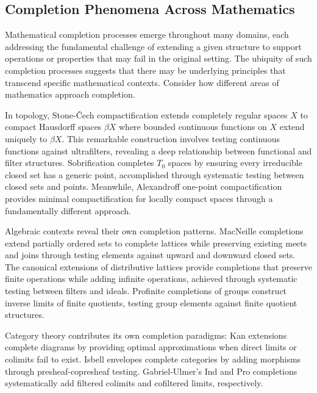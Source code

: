 \documentclass[11pt]{article}
\theoremstyle{plain}
\theoremstyle{definition}
\theoremstyle{remark}
\begin{document}
\subsection{Completion Phenomena Across Mathematics}
Mathematical completion processes emerge throughout many domains, each addressing the fundamental challenge of extending a given structure to support operations or properties that may fail in the original setting. The ubiquity of such completion processes suggests that there may be underlying principles that transcend specific mathematical contexts. Consider how different areas of mathematics approach completion.

In topology, Stone-\v{C}ech compactification \cite{stone1936theory} extends completely regular spaces $X$ to compact Hausdorff spaces $\beta X$ where bounded continuous functions on $X$ extend uniquely to $\beta X$. This remarkable construction involves testing continuous functions against ultrafilters, revealing a deep relationship between functional and filter structures. Sobrification \cite{johnstone1982stone} completes $T_0$ spaces by ensuring every irreducible closed set has a generic point, accomplished through systematic testing between closed sets and points. Meanwhile, Alexandroff one-point compactification \cite{alexandroff1924point} provides minimal compactification for locally compact spaces through a fundamentally different approach.

Algebraic contexts reveal their own completion patterns. MacNeille completions \cite{macneille1937extension} extend partially ordered sets to complete lattices while preserving existing meets and joins through testing elements against upward and downward closed sets. The canonical extensions of distributive lattices \cite{jonsson1951boolean,gehrke2001bounded} provide completions that preserve finite operations while adding infinite operations, achieved through systematic testing between filters and ideals. Profinite completions of groups \cite{pontryagin1966topological} construct inverse limits of finite quotients, testing group elements against finite quotient structures.

Category theory contributes its own completion paradigms: Kan extensions \cite{kan1958adjoint} complete diagrams by providing optimal approximations when direct limits or colimits fail to exist. Isbell envelopes \cite{isbell1960adequate,garner2018isbell} complete categories by adding morphisms through presheaf-copresheaf testing. Gabriel-Ulmer's Ind and Pro completions \cite{gabriel1971lokal,adamek1994locally} systematically add filtered colimits and cofiltered limits, respectively.
\end{document}
